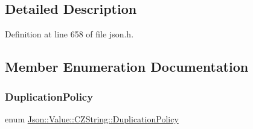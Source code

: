 \subsection{Detailed Description}


Definition at line 658 of file json.\+h.



\subsection{Member Enumeration Documentation}
\hypertarget{class_json_1_1_value_1_1_c_z_string_a2805c46fb4a72bbaed55de6d75941b6d}{}\label{class_json_1_1_value_1_1_c_z_string_a2805c46fb4a72bbaed55de6d75941b6d} 
\subsubsection{\texorpdfstring{Duplication\+Policy}{DuplicationPolicy}\hspace{0.1cm}{\footnotesize\ttfamily [1/2]}}
{\footnotesize\ttfamily enum \hyperlink{class_json_1_1_value_1_1_c_z_string_a2805c46fb4a72bbaed55de6d75941b6d}{Json\+::\+Value\+::\+C\+Z\+String\+::\+Duplication\+Policy}}

